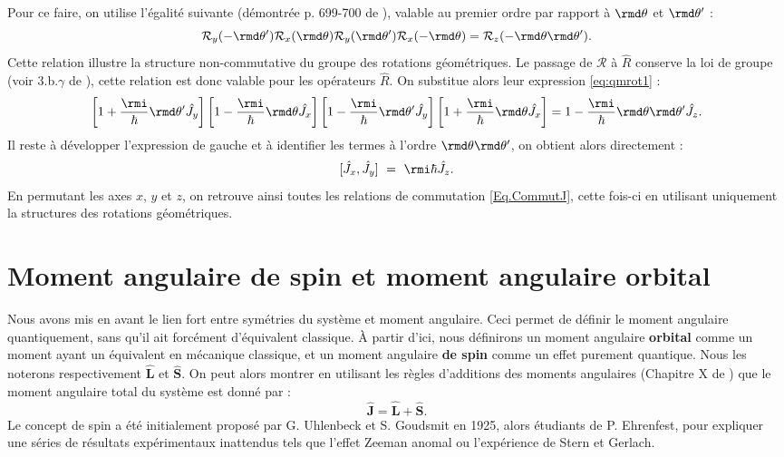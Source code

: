 Pour ce faire, on utilise l'égalité suivante (démontrée p. 699-700 de ), valable au premier ordre par rapport à $\rmd\theta$ et $\rmd\theta'$ :
\[\mathcal{R}_y(-\rmd\theta')\mathcal{R}_x(\rmd\theta)\mathcal{R}_y(\rmd\theta')\mathcal{R}_x(-\rmd\theta)=\mathcal{R}_z(-\rmd\theta\rmd\theta').\]
Cette relation illustre la structure non-commutative du groupe des rotations géométriques. Le passage de $\mathcal{R}$ à $\hat{R}$ conserve la loi de groupe (voir 3.b.$\gamma$ de ), cette relation est donc valable pour les opérateurs $\hat{R}$. On substitue alors leur expression \ref{eq:qmrot1} :
\[\left[1+\frac{\rmi}{\hbar}\rmd\theta'\hat{J_y}\right]
\left[1-\frac{\rmi}{\hbar}\rmd\theta\hat{J_x}\right]
\left[1-\frac{\rmi}{\hbar}\rmd\theta'\hat{J_y}\right]
\left[1+\frac{\rmi}{\hbar}\rmd\theta\hat{J_x}\right] = 
1-\frac{\rmi}{\hbar}\rmd\theta\rmd\theta'\hat{J_z}. \]
Il reste à développer l'expression de gauche et à identifier les termes à l'ordre $\rmd\theta\rmd\theta'$, on obtient alors directement :
\[[\hat{J}_x,\hat{J}_y]~=~\rmi\hbar \hat{J}_z.\]
En permutant les axes $x$, $y$ et $z$, on retrouve ainsi toutes les relations de commutation \ref{Eq.CommutJ}, cette fois-ci en utilisant uniquement la structures des rotations géométriques. 

\section{Moment angulaire de spin et moment angulaire orbital}
Nous avons mis en avant le lien fort entre symétries du système et moment angulaire. Ceci permet de définir le moment angulaire quantiquement, sans qu'il ait forcément d'équivalent classique. \`A partir d'ici, nous définirons un moment angulaire \textbf{orbital} comme un moment ayant un équivalent en mécanique classique, et un moment angulaire \textbf{de spin} comme un effet purement quantique. Nous les noterons respectivement $\bm{\hat{L}}$ et $\bm{\hat{S}}$. On peut alors montrer en utilisant les règles d'additions des moments angulaires (Chapitre X de ) que le moment angulaire total du système est donné par :
\begin{equation}
\bm{\hat{J}}=\bm{\hat{L}}+\bm{\hat{S}}.
\label{Eq.JegalLplusS}
\end{equation}
Le concept de spin a été initialement proposé par G. Uhlenbeck et S. Goudsmit en 1925, alors étudiants de P. Ehrenfest, pour expliquer une séries de résultats expérimentaux inattendus tels que l'effet Zeeman anomal ou l'expérience de Stern et Gerlach. 

